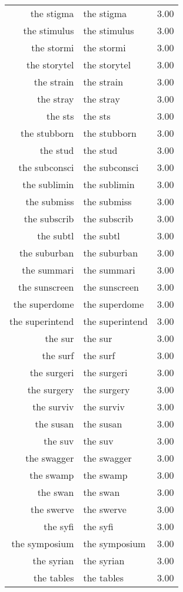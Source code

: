 \begin{table}[ht]
\begin{tabular}{rlr}
  the stigma & the stigma & 3.00 \\ 
  the stimulus & the stimulus & 3.00 \\ 
  the stormi & the stormi & 3.00 \\ 
  the storytel & the storytel & 3.00 \\ 
  the strain & the strain & 3.00 \\ 
  the stray & the stray & 3.00 \\ 
  the sts & the sts & 3.00 \\ 
  the stubborn & the stubborn & 3.00 \\ 
  the stud & the stud & 3.00 \\ 
  the subconsci & the subconsci & 3.00 \\ 
  the sublimin & the sublimin & 3.00 \\ 
  the submiss & the submiss & 3.00 \\ 
  the subscrib & the subscrib & 3.00 \\ 
  the subtl & the subtl & 3.00 \\ 
  the suburban & the suburban & 3.00 \\ 
  the summari & the summari & 3.00 \\ 
  the sunscreen & the sunscreen & 3.00 \\ 
  the superdome & the superdome & 3.00 \\ 
  the superintend & the superintend & 3.00 \\ 
  the sur & the sur & 3.00 \\ 
  the surf & the surf & 3.00 \\ 
  the surgeri & the surgeri & 3.00 \\ 
  the surgery & the surgery & 3.00 \\ 
  the surviv & the surviv & 3.00 \\ 
  the susan & the susan & 3.00 \\ 
  the suv & the suv & 3.00 \\ 
  the swagger & the swagger & 3.00 \\ 
  the swamp & the swamp & 3.00 \\ 
  the swan & the swan & 3.00 \\ 
  the swerve & the swerve & 3.00 \\ 
  the syfi & the syfi & 3.00 \\ 
  the symposium & the symposium & 3.00 \\ 
  the syrian & the syrian & 3.00 \\ 
  the tables & the tables & 3.00 \\ 

\end{tabular}
\end{table}
